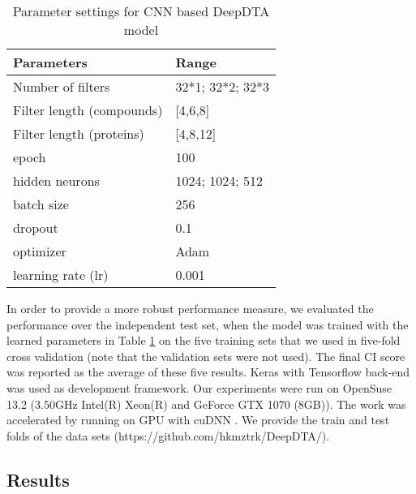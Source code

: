 \documentclass[11pt,letterpaper]{article}
\begin{document}
\begin{table}[H]
\centering
\caption{Parameter settings for CNN based DeepDTA model}
\label{tab:paramss1}
\begin{tabular}{ll}
\hline
\textbf{Parameters} & \textbf{Range}  \\ \hline
Number of filters      & 32*1; 32*2; 32*3   \\ \hline
Filter length (compounds)        &   [4,6,8]  \\ \hline
Filter length (proteins) & [4,8,12]  \\ \hline
epoch & 100  \\ \hline
hidden neurons & 1024; 1024; 512  \\ \hline
batch size & 256   \\ \hline
dropout & 0.1 \\ \hline
optimizer & Adam \\ \hline
learning rate (lr) & 0.001  \\ \hline

\end{tabular}
\end{table}

In order to provide a more robust performance measure, we evaluated the performance over the independent test set, when the model was trained with the learned parameters in Table \ref{tab:paramss1} on the five training sets that we used in five-fold cross validation (note that the validation sets were not used).  The final CI score was reported as the average of these five results. Keras \cite{chollet2015keras} with Tensorflow \cite{abadi2016tensorflow} back-end was used as development framework. Our experiments were run on OpenSuse 13.2 (3.50GHz  Intel(R) Xeon(R) and GeForce GTX 1070  (8GB)). The work was accelerated by running on GPU with cuDNN \cite{chetlur2014cudnn}. We provide the train and test folds of the data sets (https://github.com/hkmztrk/DeepDTA/).

\subsection*{Results}
\end{document}
